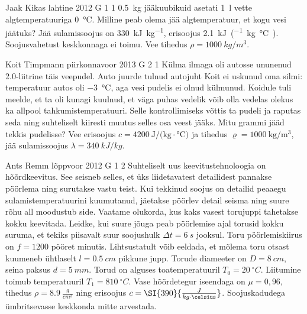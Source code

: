 \documentclass[11pt, twoside]{article}
\begin{document}
{%
{Jaak Kikas} %
{lahtine} %
{2012} %
{G 1} %
{1} %
{
\ifStatement
\SI{0,5}{\kilo\gram} jääkuubikuid asetati \SI{1}{l} vette algtemperatuuriga
\SI{0}{\celsius}. Milline peab olema jää algtemperatuur, et kogu vesi jäätuks?
Jää sulamissoojus on \SI{330}{\kilo\joule\per\kilo\gram}, erisoojus
\SI{2,1}{\kilo\joule\per(\kilogram.\celsius)}. Soojusvahetust keskkonnaga ei
toimu.
Vee tihedus $\rho = \SI{1000}{kg/m^3}$.
\fi
}

{Koit Timpmann} %
{piirkonnavoor} %
{2013} %
{G 2} %
{1} %
{
\ifStatement
Külma ilmaga oli autosse ununenud \num{2,0}-liitrine täis veepudel. Auto juurde tulnud
autojuht Koit ei uskunud oma silmi: temperatuur autos oli \SI{-3}{\celsius},
aga vesi pudelis ei olnud külmunud. Koidule tuli meelde, et ta oli kunagi
kuulnud, et väga puhas vedelik võib olla vedelas olekus ka allpool
tahkumistemperatuuri. Selle kontrollimiseks võttis ta pudeli ja raputas seda
ning suhteliselt kiiresti muutus selles osa veest jääks. Mitu grammi jääd tekkis
pudelisse? Vee erisoojus $c = \SI{4200}{\joule\per(\kilogram \cdot \celsius)}$
ja tihedus $\varrho = \SI{1000}{\kilogram\per\meter\cubed}$, jää
sulamissoojus $\lambda = \SI{340}{ kJ/kg}$. 
\fi
}

{Ants Remm} %
{lõppvoor} %
{2012} %
{G 1} %
{2} %
{
\ifStatement
Suhteliselt uus keevitustehnoloogia on hõõrdkeevitus. See seisneb selles, et üks
liidetavatest detailidest pannakse pöörlema ning surutakse vastu teist. Kui
tekkinud soojus on detailid peaaegu sulamistemperatuurini kuumutanud, jäetakse
pöörlev detail seisma ning suure rõhu all moodustub side. Vaatame olukorda, kus
kaks vasest torujuppi tahetakse kokku keevitada. Leidke, kui suure jõuga peab
pöörlemise ajal torusid kokku suruma, et tekiks piisavalt suur soojushulk
$\Delta t = \SI{6}{s}$ jooksul. Toru pöörlemiskiirus on $f = 1200$ pööret
minutis. Lihtsustatult võib eeldada, et mõlema toru otsast kuumeneb ühtlaselt $l
= \SI{0,5}{cm}$ pikkune jupp. Torude diameeter on $D = \SI{8}{cm}$, seina paksus
$d = \SI{5}{mm}$. Torud on alguses toatemperatuuril $T_0 = \SI{20}{^\circ C}$.
Liitumine toimub temperatuuril $T_1 = \SI{810}{^\circ C}$. Vase hõõrdetegur
iseendaga on $\mu = 0,96$, tihedus $\rho = \SI{8,9}{\frac{g}{cm^3}}$ ning
erisoojus $c = \SI{390}{\frac{J}{kg \cdot \celsius}}$. Soojuskadudega ümbritsevasse
keskkonda mitte arvestada.
\fi
}

}
\end{document}
